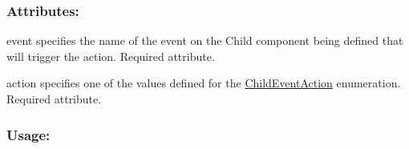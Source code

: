 \hypertarget{fal_element_ref_fal_elem_ref_eventaction_2}{}\subsubsection{Attributes\+:}\label{fal_element_ref_fal_elem_ref_eventaction_2}
\begin{DoxyItemize}
\item {\ttfamily event} specifies the name of the event on the Child component being defined that will trigger the action. Required attribute. \item {\ttfamily action} specifies one of the values defined for the \mbox{\hyperlink{fal_enum_ref_fal_enum_ref_sec_12}{Child\+Event\+Action}} enumeration. Required attribute.\end{DoxyItemize}
\hypertarget{fal_element_ref_fal_elem_ref_eventaction_3}{}\subsubsection{Usage\+:}\label{fal_element_ref_fal_elem_ref_eventaction_3}

